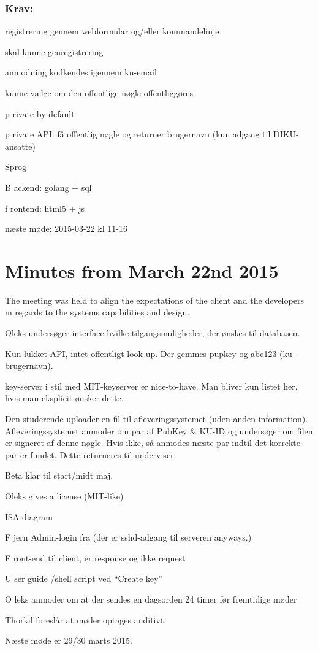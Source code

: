 \documentclass[11pt,a4paper]{report}
\let\OldItem\item
\newcommand{\SubItemStart}[1]{%
    \let\item\SubItemEnd
    \begin{SubItemList}[resume]%
        \OldItem #1%
}
\newcommand{\SubItemMiddle}[1]{%
    \OldItem #1%
}
\newcommand{\SubItemEnd}[1]{%
    \end{SubItemList}%
    \let\item\OldItem
    \item #1%
}
\newcommand*{\SubItem}[1]{%
    \let\SubItem\SubItemMiddle%
    \SubItemStart{#1}%
}%
\begin{document}
\begin{appendices}
\subsubsection{Krav:}
\begin{itemize}
\item registrering gennem webformular og/eller kommandelinje
\item skal kunne genregistrering
\item anmodning kodkendes igennem ku-email
\item kunne vælge om den offentlige nøgle offentliggøres
\SubItem private by default
\item private API: få offentlig nøgle og returner brugernavn (kun adgang til DIKU-ansatte)
\item Sprog
\SubItem Backend: golang + sql
\SubItem frontend: html5 + js
\end{itemize}

næste møde:
2015-03-22 kl 11-16

\section{Minutes from March 22nd 2015}
The meeting was held to align the expectations of the client and the developers in regards to the systems capabilities and design.

\begin{itemize}
\item Oleks undersøger interface hvilke tilgangsmuligheder, der ønskes til databasen.
\item Kun lukket API, intet offentligt look-up. Der gemmes pupkey og abc123 (ku-brugernavn).
\item key-server i stil med MIT-keyserver er nice-to-have. Man bliver kun listet her, hvis man eksplicit ønsker dette.
\item Den studerende uploader en fil til afleveringssystemet (uden anden information). Afleveringssystemet anmoder om par af PubKey \& KU-ID og undersøger om filen er signeret af denne nøgle. Hvis ikke, så anmodes næste par indtil det korrekte par er fundet. Dette returneres til underviser.
\item Beta klar til start/midt maj.
\item Oleks gives a license (MIT-like)
\item ISA-diagram
\SubItem Fjern Admin-login fra (der er sshd-adgang til serveren anyways.)
\SubItem Front-end til client, er response og ikke request
\SubItem User guide /shell script ved ``Create key''
\item Oleks anmoder om at der sendes en dagsorden 24 timer før fremtidige møder
\item Thorkil foreslår at møder optages auditivt.
\end{itemize}

Næste møde er 29/30 marts 2015.
\end{appendices}
\end{document}
